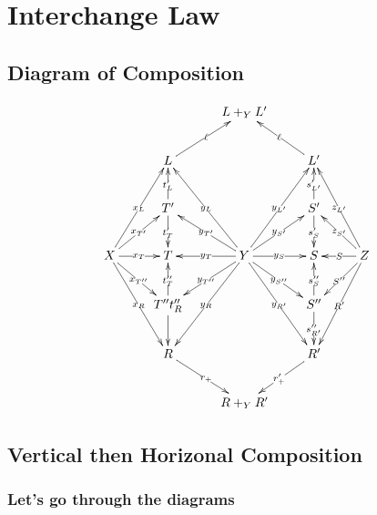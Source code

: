 \documentclass[12pt]{article}
\renewcommand{\(}{\left(}
\renewcommand{\)}{\right)}
\renewcommand{\{}{\left\lbrace}
\renewcommand{\}}{\right\rbrace}
\theoremstyle{remark}
\theoremstyle{definition}
\begin{document}
\section*{Interchange Law}


\subsection*{Diagram of Composition}
\begin{equation} \label{Diag:ToBeComposed}
\xymatrix{
	{} &
	{} &
	L+_YL' &
	{} &
	{} \\
	{} &
	L  
	\ar[ru]|{\ell} &
	{} &
	L' 
	\ar[lu]|{\ell}&
	{} \\
	{} &
	T' 
	\ar[u]|{t'_L}
	\ar[d]|{t'_T} &
	{} &
	S' 
	\ar[u]|{s'_{L'}}
	\ar[d]|{s'_S}&
	{} \\
	X 
	\ar[ruu]|{x_L}
	\ar[ru]|{x_{T'}}
	\ar[r]|{x_T}
	\ar[rd]|{x_{T''}}
	\ar[rdd]|{x_R}&
	T &
	Y 
	\ar[luu]|{y_{L}}
	\ar[lu]|{y_{T'}}
	\ar[l]|{y_{T}}
	\ar[ld]|{y_{T''}}
	\ar[ldd]|{y_{R}}
	\ar[ruu]|{y_{L'}}
	\ar[ru]|{y_{S'}}
	\ar[r]|{y_{S}}
	\ar[rd]|{y_{S''}}
	\ar[rdd]|{y_{R'}} &
	S &
	Z 
	\ar[luu]|{z_{L'}}
	\ar[lu]|{z_{S'}}
	\ar[l]|{S}
	\ar[ld]|{S''}
	\ar[ldd]|{R'}\\
	{} &
	T'' 
	\ar[u]|{t''_T}
	\ar[d]{t''_R}&
	{} &
	S'' 
	\ar[u]|{s''_S}
	\ar[d]|{s''_{R'}}&
	{} \\
	{} &
	R 
	\ar[rd]|{r_+}
	{} &
	{} &
	R' 
	\ar[ld]|{r'_+} \\
	{} &
	{} &
	R +_Y R' &
	{} &
	{}
}	
\end{equation}

\subsection*{Vertical then Horizonal Composition}

\subsubsection*{Let's go through the diagrams}
\end{document}
